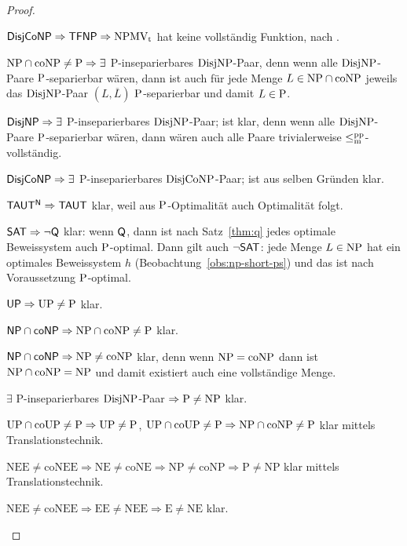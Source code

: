 \begin{proof}
\begin{Prooflist}[nosep,midpenalty=0, label={\arabic*.},labelsep=3pt]
\item $\hDisjCoNP \Rightarrow \hTFNP \Rightarrow \NPMVt$ hat keine vollständig Funktion, nach \textcite[Prop.~5.6, 5.10]{pudlak_incompleteness_2017}.
\item $\NP\cap\coNP\neq \P \Rightarrow\exists$ P-inseparierbares $\DisjNP$-Paar, denn wenn alle $\DisjNP$-Paare $\P$-separierbar wären, dann ist auch für jede Menge $L\in\NP\cap\coNP$ jeweils das $\DisjNP$-Paar $(L,\overline{L})$ $\P$-separierbar und damit $L\in\P$.
\item $\hDisjNP \Rightarrow \exists$ P-inseparierbares $\DisjNP$-Paar; ist klar, denn wenn alle $\DisjNP$-Paare $\P$-separierbar wären, dann wären auch alle Paare trivialerweise $\leqmpp$-vollständig.
\item $\hDisjCoNP \Rightarrow \exists$ P-inseparierbares $\DisjCoNP$-Paar; ist aus selben Gründen klar.
\item $\mathsf{TAUT^N} \Rightarrow \hTAUT$ klar, weil aus $\P$-Optimalität auch Optimalität folgt.
\item $\mathsf \hSAT \Rightarrow \neg\hQ $ klar: wenn $\hQ$, dann ist nach Satz~\ref{thm:q} jedes optimale Beweissystem auch $\P$-optimal. Dann gilt auch $\neg\hSAT$: jede Menge $L\in\NP$ hat ein optimales Beweissystem $h$ (Beobachtung~\ref{obs:np-short-ps}) und das ist nach Voraussetzung $\P$-optimal.
\item $\hUP \Rightarrow \UP\neq\P$ klar.
\item $\hNPcoNP \Rightarrow \NP\cap\coNP\neq \P$ klar.
\item $\hNPcoNP \Rightarrow \NP\neq\coNP$ klar, denn wenn $\NP=\coNP$ dann ist $\NP\cap\coNP=\NP$ und damit existiert auch eine vollständige Menge.
\item $\exists$ P-inseparierbares $\DisjNP$-Paar $\Rightarrow \P\neq \NP$ klar.
\item $\UP\cap\coUP\neq\P \Rightarrow \UP\neq \P$, $\UP\cap\coUP\neq\P\Rightarrow \NP\cap\coNP\neq\P$ klar mittels Translationstechnik.
\item $\mathrm{NEE\neq coNEE \Rightarrow NE \neq coNE \Rightarrow NP \neq coNP \Rightarrow P\neq NP}$ klar mittels Translationstechnik.
\item $\mathrm{NEE\neq coNEE \Rightarrow EE \neq NEE \Rightarrow E\neq NE}$ klar.\qedhere
\end{Prooflist}
\end{proof}

